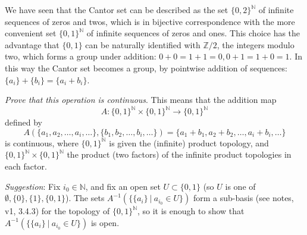 \documentclass{jhwhw}
\newcommand{\Z}{{\mathbb Z}}
\newcommand{\N}{{\mathbb N}}
\begin{document}
\problem{}%
We have seen that the Cantor set can be described as the set $\{0,2\}^\N$ of infinite sequences of zeros and twos, which is in bijective correspondence with the more convenient set $\{0,1\}^\N$ of infinite sequences of zeros and ones.  This choice has  the advantage that $\{0,1\}$ can be  naturally identified with $\Z/2$, the integers modulo two, which forms a group under addition:  $ 0 + 0 = 1+ 1 = 0, 0+1 = 1+ 0 = 1$.  In this way the Cantor set becomes a group, by pointwise addition of sequences: $\{a_i\} + \{b_i\} = \{a_i + b_i \}$.  

\emph{ Prove that this operation is continuous}. This means that the  addition  map
$$
A: \{0,1\}^\N\times\{0,1\}^\N \to \{0,1\}^\N 
$$
defined by
$$
A(\{a_1,a_2,\dots, a_i,\dots  \},\{b_1,b_2,\dots, b_i,\dots\})  = \{a_1 + b_1, a_2+b_2,\dots , a_i +b_i,\dots \}
$$
is continuous, where $\{0,1\}^\N$ is given the (infinite) product topology, and $\{0,1\}^\N\times\{0,1\}^\N$ the product (two factors) of the infinite product topologies in each factor.

\emph{Suggestion}:  Fix $i_0\in\N$, and  fix an open set $U\subset \{0,1\}$ (so  $U $ is one of $\emptyset, \{0\}, \{1\},\{0,1\}$).  The sets $A^{-1}(\{ \{a_i\} \ | \ a_{i_0}\in U\})$ form a sub-basis (see notes, v1,  3.4.3)  for the topology of $\{0,1\}^\N$, so it is enough to show that $A^{-1}(\{ \{a_i\} \ | \ a_{i_0}\in U\})$ is open.

\solution{}
\end{document}
